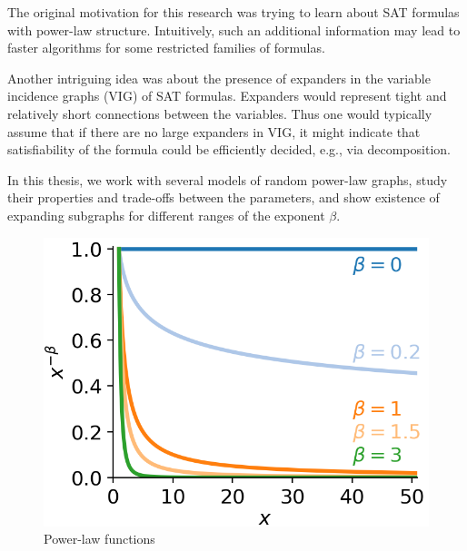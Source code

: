 The original motivation for this research was trying to learn
about SAT formulas with power-law structure.
Intuitively, such an additional information may lead
to faster algorithms for some restricted families of formulas.

Another intriguing idea was about the presence of expanders
in the variable incidence graphs (VIG) of SAT formulas.
Expanders would represent tight and relatively short connections
between the variables. Thus one would typically assume that if there are
no large expanders in VIG, it might indicate that satisfiability
of the formula could be efficiently decided, e.g., via decomposition.

In this thesis, we work with several models of random power-law graphs,
study their properties and trade-offs between the parameters,
and show existence of expanding subgraphs for different ranges of the exponent $\beta$.

\begin{figure}
    \centering
    \includegraphics[scale=0.75]{images/generated/power-law}
    \caption{Power-law functions}
    \label{fig:power-law-functions}
\end{figure}

